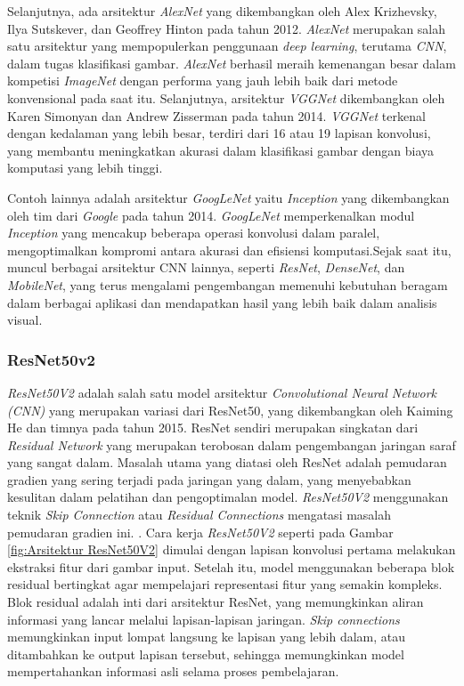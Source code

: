 Selanjutnya, ada arsitektur \textit{AlexNet} yang dikembangkan oleh Alex Krizhevsky, Ilya Sutskever, dan Geoffrey Hinton pada tahun 2012. \textit{AlexNet} merupakan salah satu arsitektur yang mempopulerkan penggunaan \textit{deep learning}, terutama \textit{CNN}, dalam tugas klasifikasi gambar. \textit{AlexNet} berhasil meraih kemenangan besar dalam kompetisi \textit{ImageNet} dengan performa yang jauh lebih baik dari metode konvensional pada saat itu. Selanjutnya, arsitektur \textit{VGGNet} dikembangkan oleh Karen Simonyan dan Andrew Zisserman pada tahun 2014. \textit{VGGNet} terkenal dengan kedalaman yang lebih besar, terdiri dari 16 atau 19 lapisan konvolusi, yang membantu meningkatkan akurasi dalam klasifikasi gambar dengan biaya komputasi yang lebih tinggi.

Contoh lainnya adalah arsitektur \textit{GoogLeNet} yaitu \textit{Inception} yang dikembangkan oleh tim dari \textit{Google} pada tahun 2014. \textit{GoogLeNet} memperkenalkan modul \textit{Inception} yang mencakup beberapa operasi konvolusi dalam paralel, mengoptimalkan kompromi antara akurasi dan efisiensi komputasi.Sejak saat itu, muncul berbagai arsitektur CNN lainnya, seperti \textit{ResNet}, \textit{DenseNet}, dan \textit{MobileNet}, yang terus mengalami pengembangan memenuhi kebutuhan beragam dalam berbagai aplikasi dan mendapatkan hasil yang lebih baik dalam analisis visual.

\subsubsection{ResNet50v2}
\textit{ResNet50V2} adalah salah satu model arsitektur \textit{Convolutional Neural Network (CNN)} yang merupakan variasi dari ResNet50, yang dikembangkan oleh Kaiming He dan timnya pada tahun 2015. ResNet sendiri merupakan singkatan dari \textit{Residual Network} yang merupakan terobosan dalam pengembangan jaringan saraf yang sangat dalam. Masalah utama yang diatasi oleh ResNet adalah pemudaran gradien yang sering terjadi pada jaringan yang dalam, yang menyebabkan kesulitan dalam pelatihan dan pengoptimalan model. \textit{ResNet50V2} menggunakan teknik \textit{Skip Connection} atau \textit{Residual Connections} mengatasi masalah pemudaran gradien ini. \cite{rahimzadeh2020modified} . Cara kerja \textit{ResNet50V2} seperti pada Gambar \ref{fig:Arsitektur ResNet50V2}
dimulai dengan lapisan konvolusi pertama melakukan ekstraksi fitur dari gambar input. Setelah itu, model menggunakan beberapa blok residual bertingkat agar mempelajari representasi fitur yang semakin kompleks. Blok residual adalah inti dari arsitektur ResNet, yang memungkinkan aliran informasi yang lancar melalui lapisan-lapisan jaringan. \textit{Skip connections} memungkinkan input lompat langsung ke lapisan yang lebih dalam, atau ditambahkan ke output lapisan tersebut, sehingga memungkinkan model mempertahankan informasi asli selama proses pembelajaran.

